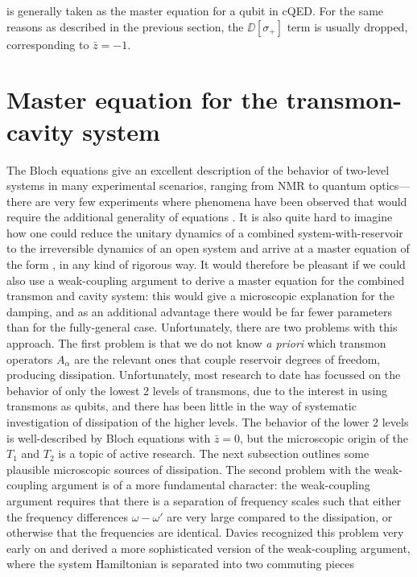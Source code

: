  is generally taken as the master equation for a qubit in cQED\@. For the same reasons as described in the previous section, the $\DD[\sigma_+]$ term is usually dropped, corresponding to $\bar{z}=-1$.

\section{Master equation for the transmon-cavity system}
\label{sec:master}
The Bloch equations give an excellent description of the behavior of two-level systems in many experimental scenarios, ranging from NMR to quantum optics---there are very few experiments where phenomena have been observed that would require the additional generality of equations . It is also quite hard to imagine how one could reduce the unitary dynamics of a combined system-with-reservoir to the irreversible dynamics of an open system and arrive at a master equation of the form , in any kind of rigorous way. It would therefore be pleasant if we could also use a weak-coupling argument to derive a master equation for the combined transmon and cavity system: this would give a microscopic explanation for the damping, and as an additional advantage there would be far fewer parameters than for the fully-general case. Unfortunately, there are two problems with this approach. The first problem is that we do not know \emph{a priori} which transmon operators $A_\alpha$ are the relevant ones that couple reservoir degrees of freedom, producing dissipation. Unfortunately, most research to date has focussed on the behavior of only the lowest 2 levels of transmons, due to the interest in using transmons as qubits, and there has been little in the way of systematic investigation of dissipation of the higher levels. The behavior of the lower 2 levels is well-described by Bloch equations with $\bar{z}=0$, but the microscopic origin of the $T_1$ and $T_2$ is a topic of active research. The next subsection outlines some plausible microscopic sources of dissipation. The second problem with the weak-coupling argument is of a more fundamental character: the weak-coupling argument requires that there is a separation of frequency scales such that either the frequency differences $\omega-\omega'$ are very large compared to the dissipation, or otherwise that the frequencies are identical. Davies recognized this problem very early on \cite{davies_1978} and derived a more sophisticated version of the weak-coupling argument, where the system Hamiltonian is separated into two commuting pieces
